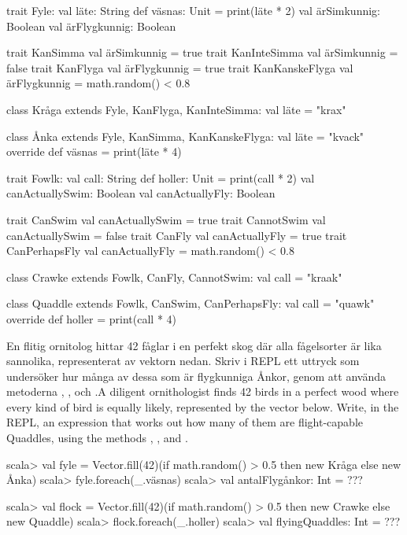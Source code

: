 \ifswedish
\begin{CodeSmall}
trait Fyle:
  val läte: String
  def väsnas: Unit = print(läte * 2)
  val ärSimkunnig: Boolean
  val ärFlygkunnig: Boolean

trait KanSimma       { val ärSimkunnig = true }
trait KanInteSimma   { val ärSimkunnig = false }
trait KanFlyga       { val ärFlygkunnig = true }
trait KanKanskeFlyga { val ärFlygkunnig = math.random() < 0.8 }

class Kråga extends Fyle, KanFlyga, KanInteSimma:
  val läte = "krax"

class Ånka extends Fyle, KanSimma, KanKanskeFlyga:
  val läte = "kvack"
  override def väsnas = print(läte * 4)
\end{CodeSmall}
\else
\begin{CodeSmall}
trait Fowlk:
  val call: String
  def holler: Unit = print(call * 2)
  val canActuallySwim: Boolean
  val canActuallyFly: Boolean

trait CanSwim       { val canActuallySwim = true }
trait CannotSwim    { val canActuallySwim = false }
trait CanFly        { val canActuallyFly = true }
trait CanPerhapsFly { val canActuallyFly = math.random() < 0.8 }

class Crawke extends Fowlk, CanFly, CannotSwim:
  val call = "kraak"

class Quaddle extends Fowlk, CanSwim, CanPerhapsFly:
  val call = "quawk"
  override def holler = print(call * 4)
\end{CodeSmall}
\fi

\Subtask \ifswedish En flitig ornitolog hittar 42 fåglar i en perfekt skog där alla fågelsorter är lika sannolika, representerat av vektorn  nedan. Skriv i REPL ett uttryck som undersöker hur många av dessa som är flygkunniga Ånkor, genom att använda metoderna , ,  och .\else A diligent ornithologist finds 42 birds in a perfect wood where every kind of bird is equally likely, represented by the vector  below. Write, in the REPL, an expression that works out how many of them are flight-capable Quaddles, using the methods , ,  and .\fi

\ifswedish
\begin{REPL}
scala> val fyle =
         Vector.fill(42)(if math.random() > 0.5 then new Kråga else new Ånka)
scala> fyle.foreach(_.väsnas)
scala> val antalFlygånkor: Int = ???
\end{REPL}
\else
\begin{REPL}
scala> val flock =
         Vector.fill(42)(if math.random() > 0.5 then new Crawke else new Quaddle)
scala> flock.foreach(_.holler)
scala> val flyingQuaddles: Int = ???
\end{REPL}
\fi

